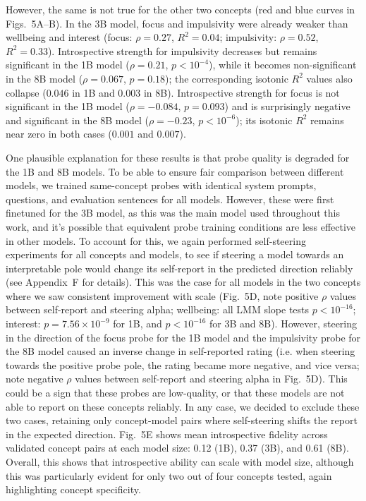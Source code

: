 \documentclass[10pt]{article}
\begin{document}
However, the same is not true for the other two concepts (red and blue curves in Figs.~5A--B). In the 3B model, focus and impulsivity were already weaker than wellbeing and interest (focus: $\rho = 0.27$, $R^2 = 0.04$; impulsivity: $\rho = 0.52$, $R^2 = 0.33$). Introspective strength for impulsivity decreases but remains significant in the 1B model ($\rho = 0.21$, $p < 10^{-4}$), while it becomes non-significant in the 8B model ($\rho = 0.067$, $p = 0.18$); the corresponding isotonic $R^2$ values also collapse ($0.046$ in 1B and $0.003$ in 8B). Introspective strength for focus is not significant in the 1B model ($\rho = -0.084$, $p = 0.093$) and is surprisingly negative and significant in the 8B model ($\rho = -0.23$, $p < 10^{-6}$); its isotonic $R^2$ remains near zero in both cases ($0.001$ and $0.007$).

One plausible explanation for these results is that probe quality is degraded for the 1B and 8B models. To be able to ensure fair comparison between different models, we trained same-concept probes with identical system prompts, questions, and evaluation sentences for all models. However, these were first finetuned for the 3B model, as this was the main model used throughout this work, and it's possible that equivalent probe training conditions are less effective in other models. To account for this, we again performed self-steering experiments for all concepts and models, to see if steering a model towards an interpretable pole would change its self-report in the predicted direction reliably (see Appendix~F for details). This was the case for all models in the two concepts where we saw consistent improvement with scale (Fig.~5D, note positive $\rho$ values between self-report and steering alpha; wellbeing: all LMM slope tests $p < 10^{-16}$; interest: $p = 7.56 \times 10^{-9}$ for 1B, and $p < 10^{-16}$ for 3B and 8B). However, steering in the direction of the focus probe for the 1B model and the impulsivity probe for the 8B model caused an inverse change in self-reported rating (i.e. when steering towards the positive probe pole, the rating became more negative, and vice versa; note negative $\rho$ values between self-report and steering alpha in Fig.~5D). This could be a sign that these probes are low-quality, or that these models are not able to report on these concepts reliably. In any case, we decided to exclude these two cases, retaining only concept-model pairs where self-steering shifts the report in the expected direction. Fig.~5E shows mean introspective fidelity across validated concept pairs at each model size: 0.12 (1B), 0.37 (3B), and 0.61 (8B). Overall, this shows that introspective ability can scale with model size, although this was particularly evident for only two out of four concepts tested, again highlighting concept specificity.
\end{document}
